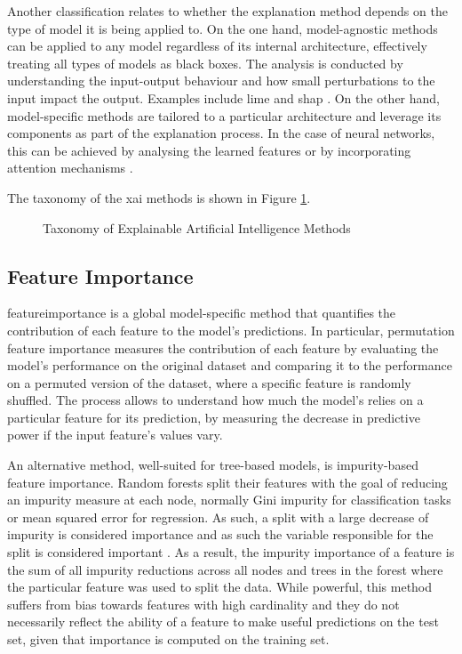 Another classification relates to whether the explanation method depends on the type of model it is being applied to. On the one hand, model-agnostic methods can be applied to any model regardless of its internal architecture, effectively treating all types of models as black boxes. The analysis is conducted by understanding the input-output behaviour and how small perturbations to the input impact the output. Examples include \acrfull{lime} \cite{Ribeiro2016} and \acrfull{shap} \cite{Lundberg2017}. On the other hand, model-specific methods are tailored to a particular architecture and leverage its components as part of the explanation process. In the case of neural networks, this can be achieved by analysing the learned features or by incorporating attention mechanisms \cite{Amirshahi2023}.

The taxonomy of the \acrshort{xai} methods is shown in Figure \ref{fig:xai_taxonomy}.
\begin{figure}[h]
    \centering
    
    \caption{Taxonomy of Explainable Artificial Intelligence Methods}
    \label{fig:xai_taxonomy}
\end{figure}

\subsection{Feature Importance} \label{sec:featureimportance}

\Gls{featureimportance} is a global model-specific method that quantifies the contribution of each feature to the model's predictions. In particular, permutation feature importance \cite{Breiman2001} measures the contribution of each feature by evaluating the model's performance on the original dataset and comparing it to the performance on a permuted version of the dataset, where a specific feature is randomly shuffled. The process allows to understand how much the model's relies on a particular feature for its prediction, by measuring the decrease in predictive power if the input feature's values vary.

An alternative method, well-suited for tree-based models, is impurity-based feature importance. Random forests split their features with the goal of reducing an impurity measure at each node, normally Gini impurity for classification tasks or mean squared error for regression. As such, a split with a large decrease of impurity is considered importance and as such the variable responsible for the split is considered important \cite{Nembrini2018}. As a result, the impurity importance of a feature is the sum of all impurity reductions across all nodes and trees in the forest where the particular feature was used to split the data. While powerful, this method suffers from bias towards features with high cardinality and they do not necessarily reflect the ability of a feature to make useful predictions on the test set, given that importance is computed on the training set. 

